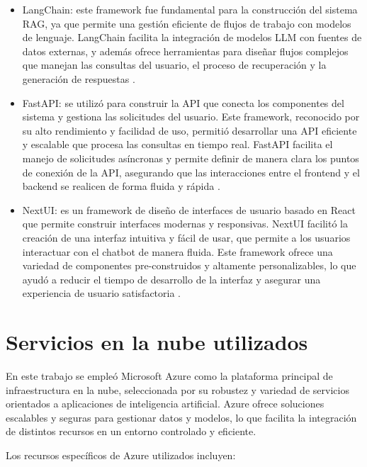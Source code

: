 \begin{itemize}
	\item LangChain: este framework fue fundamental para la construcción del sistema RAG, ya que permite una gestión 
	eficiente de flujos de trabajo con modelos de lenguaje. LangChain facilita la integración de modelos LLM con fuentes de datos externas, 
	y además ofrece herramientas para diseñar flujos complejos 
	que manejan las consultas del usuario, el proceso de recuperación y la generación de respuestas \citep{website:langchain}.
	\item FastAPI: se utilizó para construir la API que conecta los componentes del sistema y gestiona las solicitudes del usuario. 
	Este framework, reconocido por su alto rendimiento y facilidad de uso, permitió desarrollar una API eficiente y escalable que procesa 
	las consultas en tiempo real. FastAPI facilita el manejo de solicitudes asíncronas y permite definir de manera clara los puntos 
	de conexión de la API, asegurando que las interacciones entre el frontend y el backend se 
	realicen de forma fluida y rápida \citep{website:fastapi}.
	\item NextUI: es un framework de diseño de interfaces de usuario 
	basado en React que permite construir interfaces modernas y responsivas. NextUI facilitó la creación de una interfaz intuitiva 
	y fácil de usar, que permite a los usuarios interactuar con el chatbot de manera fluida. Este framework ofrece una variedad de 
	componentes pre-construidos y altamente personalizables, lo que ayudó a reducir el tiempo de desarrollo de la interfaz y asegurar 
	una experiencia de usuario satisfactoria \citep{website:nextui}.
\end{itemize}

\section{Servicios en la nube utilizados}

En este trabajo se empleó Microsoft Azure \citep{website:azure} como la plataforma principal de infraestructura en la nube, seleccionada por su robustez y 
variedad de servicios orientados a aplicaciones de inteligencia artificial. Azure ofrece soluciones 
escalables y seguras para gestionar datos y modelos, lo que facilita la integración de distintos recursos en un entorno controlado y eficiente.

Los recursos específicos de Azure utilizados incluyen:

